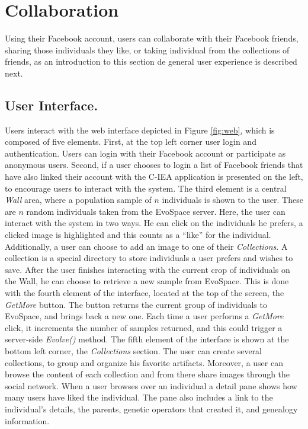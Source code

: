 \documentclass{sig-alternate}
\begin{document}
\section{Collaboration}
\label{sec:col}
Using their Facebook account, users can collaborate with their Facebook friends, sharing those individuals they like, or taking individual from the collections of friends, as an introduction to this section de general user experience is described next.

\subsection{User Interface.}
Users interact with the web interface depicted in Figure \ref{fig:web}, which is composed of five elements.
First, at the top left corner user login and authentication.
Users can login with their Facebook account or participate as anonymous users.
Second, if a user chooses to login a list of Facebook friends that have also linked their account with the C-IEA application is presented on the left, to encourage users to interact with the system. The third element is a central \emph{ Wall } area, where a population sample of $n$ individuals is shown to the user.
These are $n$ random individuals taken from the EvoSpace server.
Here, the user can interact with the system in two ways.
He can click on the individuals he prefers, a clicked image is highlighted and this counts as a ``like'' for the individual.
Additionally, a user can choose to add an image to one of their \emph{Collections}.
A collection is a special directory to store individuals a user prefers and wishes to save. After the user finishes interacting with the current crop of individuals on the Wall, he can choose to retrieve a new sample from EvoSpace.
This is done with the fourth element of the interface, located at the top of the screen, the \emph{GetMore} button.
The button returns the current group of individuals to EvoSpace, and brings back a new one.
Each time a user performs a \emph{GetMore} click, it increments the number of samples returned, and this could  trigger a server-side \emph{Evolve()} method. The fifth element of the interface is shown at the bottom left corner, the \emph{Collections} section.
The user can create several collections, to group and organize his favorite artifacts.
Moreover, a user can browse the content of each collection and from there share images through the social network.
When a user browses over an individual a detail pane shows how many users have liked the individual.
The pane also includes a link to the individual's details, the parents, genetic operators that created it, and genealogy information.
\end{document}
